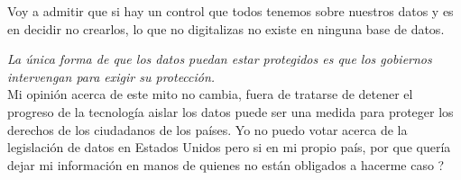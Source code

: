 \documentclass[12pt,a4paper]{article}
\begin{document}
\begin{enumerate}
\begin{enumerate}
				Voy a admitir que si hay un control que todos
				tenemos sobre nuestros datos y es en decidir no
				crearlos, lo que no digitalizas no existe
				en ninguna base de datos.

				\textit{La única forma de que los datos puedan estar protegidos es que
				los gobiernos intervengan para exigir su protección.}\\

				Mi opinión acerca de este mito no cambia,
				fuera de tratarse de detener el progreso de la tecnología
				aislar los datos puede ser una medida para proteger los
				derechos de los ciudadanos de los países.
				Yo no puedo votar acerca de la legislación de datos
				en Estados Unidos pero si en mi propio país, por que
				quería dejar mi información en manos de quienes no
				están obligados a hacerme caso ?

		\end{enumerate}

\end{enumerate}
\end{document}
